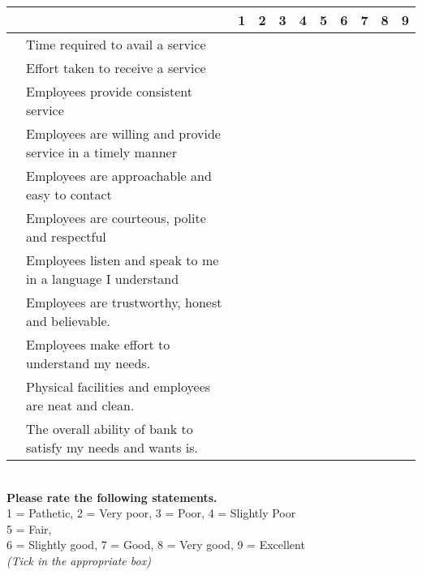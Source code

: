 \documentclass[10pt,a4paper]{article}
\newcounter{magicrownumbers}
\newcommand\rownumber{\stepcounter{magicrownumbers}\arabic{magicrownumbers}}
\newcommand \tab[1][1cm]{\hspace*{#1}}
\begin{document}
{\begin{minipage}{\textwidth}
\begin{tabularx}{\linewidth}{|l|l|X|X|X|X|X|X|X|X|X|}
\hline \multicolumn{2}{|c|}{} & 1 & 2 & 3 & 4 & 5 & 6 & 7 & 8 & 9\\
\hline \rownumber & Time required to avail a service & \tab & \tab & \tab & \tab & \tab& \tab & \tab & \tab & \tab \\
\hline \rownumber & Effort taken to receive a service & \tab & \tab & \tab & \tab & \tab& \tab & \tab & \tab & \tab \\
\hline \rownumber & Employees provide consistent service & \tab & \tab & \tab & \tab & \tab& \tab & \tab & \tab & \tab \\
\hline \rownumber & Employees are willing and provide service in a timely manner & \tab & \tab & \tab & \tab & \tab& \tab & \tab & \tab & \tab \\
\hline \rownumber & Employees are approachable and easy to contact & \tab & \tab & \tab & \tab & \tab& \tab & \tab & \tab & \tab \\
\hline \rownumber & Employees are courteous, polite and respectful & \tab & \tab & \tab & \tab & \tab& \tab & \tab & \tab & \tab \\
\hline \rownumber & Employees listen and speak to me in  a language I understand & \tab & \tab & \tab & \tab & \tab& \tab & \tab & \tab & \tab \\
\hline \rownumber & Employees are trustworthy, honest and believable. & \tab & \tab & \tab & \tab & \tab& \tab & \tab & \tab & \tab \\
\hline \rownumber & Employees make effort to understand my needs.  & \tab & \tab & \tab & \tab & \tab& \tab & \tab & \tab & \tab \\
\hline \rownumber & Physical facilities and employees are neat and clean. & \tab & \tab & \tab & \tab & \tab& \tab & \tab & \tab & \tab \\
\hline \rownumber & The overall ability of bank to satisfy my needs and wants is. & \tab & \tab & \tab & \tab & \tab& \tab & \tab & \tab & \tab \\
\hline
\end{tabularx}

\end{minipage}
\begin{minipage}{\textwidth}
\tab \\
\textbf{Please rate the following statements.}\\
1 = Pathetic, 2 = Very poor, 3 = Poor, 4 = Slightly Poor\\
5 = Fair,\\
6 = Slightly good, 7 = Good, 8 = Very good, 9 = Excellent\\
\emph {(Tick in the appropriate box)}\\



\end{minipage}}
\end{document}
